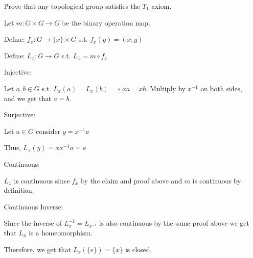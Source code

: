 \documentclass[12pt, letterpaper]{article}
\begin{document}
\begin{subproblem}{}
    Prove that any topological group satisfies the $T_1$ axiom.
\end{subproblem}
\begin{problemproof}
    Let $m : G \times G \to G$ be the binary operation map.

    Define: $f_x : G \to \{x\} \times G$ s.t. $f_x(g)=(x,g)$

    Define: $L_x : G \to G$ s.t. $L_x = m \circ f_x$

    Injective:

    Let $a,b \in G$ s.t. $L_x(a)=L_x(b) \implies xa=xb$. Multiply by $x^{-1}$ on both sides, and we get that $a=b$.

    Surjective:

    Let $a \in G$ consider $y=x^{-1}a$

    Thus, $L_x(y)=xx^{-1}a=a$

    Continuous:

    $L_x$ is continuous since $f_x$ by the claim and proof above and $m$ is continuous by definition.

    Continuous Inverse:

    Since the inverse of $L_x^{-1}=L_{x^{-1}}$ is also continuous by the same proof above we get that $L_x$ is a homeomorphism.

    Therefore, we get that $L_x(\{e\})=\{x\}$ is closed.
\end{problemproof}
\end{document}
